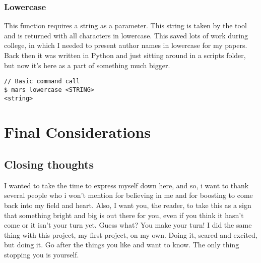 \documentclass{report}
\begin{document}
\subsection{Lowercase}
This function requires a string as a parameter. This string is taken by the tool and is returned with all characters in lowercase. This saved lots of work during college, in which I needed to present author names in lowercase for my papers. Back then it was written in Python and just sitting around in a scripts folder, but now it's here as a part of something much bigger.
\begin{lstlisting}
// Basic command call
$ mars lowercase <STRING>
<string>
\end{lstlisting}

\chapter{Final Considerations}
\section{Closing thoughts}
I wanted to take the time to express myself down here, and so, i want to thank several people who i won't mention for believing in me and for boosting to come back into my field and heart. Also, I want you, the reader, to take this as a sign that something bright and big is out there for you, even if you think it hasn't come or it isn't your turn yet. Guess what? You make your turn! I did the same thing with this project, my first project, on my own. Doing it, scared and excited, but doing it. Go after the things you like and want to know. The only thing stopping you is yourself.

\printbibliography[title=Citations]
\end{document}
